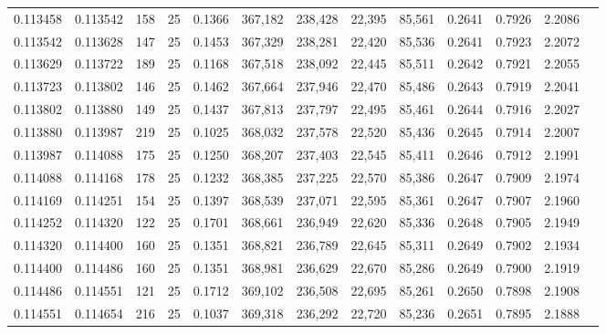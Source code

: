 \begin{tabular}{rrrrrrrrrrrrr}
0.113458 & 0.113542 &   158 &  25 &                                     0.1366 & 367,182 & 238,428 &  22,395 &  85,561 & 0.2641 & 0.7926 & 2.2086 \\
0.113542 & 0.113628 &   147 &  25 &                                     0.1453 & 367,329 & 238,281 &  22,420 &  85,536 & 0.2641 & 0.7923 & 2.2072 \\
0.113629 & 0.113722 &   189 &  25 &                                     0.1168 & 367,518 & 238,092 &  22,445 &  85,511 & 0.2642 & 0.7921 & 2.2055 \\
0.113723 & 0.113802 &   146 &  25 &                                     0.1462 & 367,664 & 237,946 &  22,470 &  85,486 & 0.2643 & 0.7919 & 2.2041 \\
0.113802 & 0.113880 &   149 &  25 &                                     0.1437 & 367,813 & 237,797 &  22,495 &  85,461 & 0.2644 & 0.7916 & 2.2027 \\
0.113880 & 0.113987 &   219 &  25 &                                     0.1025 & 368,032 & 237,578 &  22,520 &  85,436 & 0.2645 & 0.7914 & 2.2007 \\
0.113987 & 0.114088 &   175 &  25 &                                     0.1250 & 368,207 & 237,403 &  22,545 &  85,411 & 0.2646 & 0.7912 & 2.1991 \\
0.114088 & 0.114168 &   178 &  25 &                                     0.1232 & 368,385 & 237,225 &  22,570 &  85,386 & 0.2647 & 0.7909 & 2.1974 \\
0.114169 & 0.114251 &   154 &  25 &                                     0.1397 & 368,539 & 237,071 &  22,595 &  85,361 & 0.2647 & 0.7907 & 2.1960 \\
0.114252 & 0.114320 &   122 &  25 &                                     0.1701 & 368,661 & 236,949 &  22,620 &  85,336 & 0.2648 & 0.7905 & 2.1949 \\
0.114320 & 0.114400 &   160 &  25 &                                     0.1351 & 368,821 & 236,789 &  22,645 &  85,311 & 0.2649 & 0.7902 & 2.1934 \\
0.114400 & 0.114486 &   160 &  25 &                                     0.1351 & 368,981 & 236,629 &  22,670 &  85,286 & 0.2649 & 0.7900 & 2.1919 \\
0.114486 & 0.114551 &   121 &  25 &                                     0.1712 & 369,102 & 236,508 &  22,695 &  85,261 & 0.2650 & 0.7898 & 2.1908 \\
0.114551 & 0.114654 &   216 &  25 &                                     0.1037 & 369,318 & 236,292 &  22,720 &  85,236 & 0.2651 & 0.7895 & 2.1888 \\

\end{tabular}
